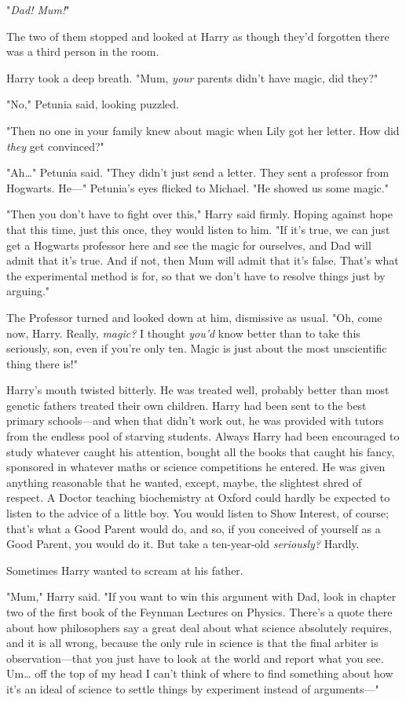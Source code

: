 "\emph{Dad! Mum!}"

The two of them stopped and looked at Harry as though they'd forgotten there 
was a third person in the room.

Harry took a deep breath. "Mum, \emph{your} parents didn't have magic, did 
they?"

"No," Petunia said, looking puzzled.

"Then no one in your family knew about magic when Lily got her letter. How did 
\emph{they} get convinced?"

"Ah{\ldots}" Petunia said. "They didn't just send a letter. They sent a 
professor from Hogwarts. He---" Petunia's eyes flicked to Michael. "He showed 
us some magic."

"Then you don't have to fight over this," Harry said firmly. Hoping against 
hope that this time, just this once, they would listen to him. "If it's true, 
we can just get a Hogwarts professor here and see the magic for ourselves, and 
Dad will admit that it's true. And if not, then Mum will admit that it's false. 
That's what the experimental method is for, so that we don't have to resolve 
things just by arguing."

The Professor turned and looked down at him, dismissive as usual. "Oh, come 
now, Harry. Really, \emph{magic?} I thought \emph{you'd} know better than to 
take this seriously, son, even if you're only ten. Magic is just about the most 
unscientific thing there is!"

Harry's mouth twisted bitterly. He was treated well, probably better than most 
genetic fathers treated their own children. Harry had been sent to the best 
primary schools---and when that didn't work out, he was provided with tutors 
from the endless pool of starving students. Always Harry had been encouraged to 
study whatever caught his attention, bought all the books that caught his 
fancy, sponsored in whatever maths or science competitions he entered. He was 
given anything reasonable that he wanted, except, maybe, the slightest shred of 
respect. A Doctor teaching biochemistry at Oxford could hardly be expected to 
listen to the advice of a little boy. You would listen to Show Interest, of 
course; that's what a Good Parent would do, and so, if you conceived of 
yourself as a Good Parent, you would do it. But take a ten-year-old 
\emph{seriously?} Hardly.

Sometimes Harry wanted to scream at his father.

"Mum," Harry said. "If you want to win this argument with Dad, look in chapter 
two of the first book of the Feynman Lectures on Physics. There's a quote there 
about how philosophers say a great deal about what science absolutely requires, 
and it is all wrong, because the only rule in science is that the final arbiter 
is observation---that you just have to look at the world and report what you 
see. Um{\ldots} off the top of my head I can't think of where to find something 
about how it's an ideal of science to settle things by experiment instead of 
arguments---"

